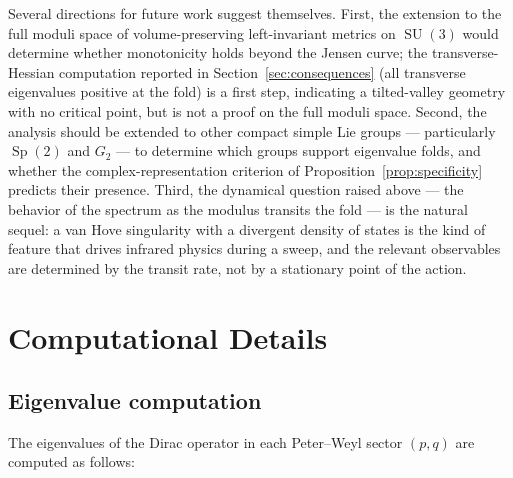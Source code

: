 \documentclass[12pt]{article}
\theoremstyle{definition}
\theoremstyle{remark}
\DeclareMathOperator{\SU}{SU}
\DeclareMathOperator{\Sp}{Sp}
\begin{document}
Several directions for future work suggest themselves.  First, the
extension to the full moduli space of volume-preserving left-invariant
metrics on $\SU(3)$ would determine whether monotonicity holds beyond
the Jensen curve; the transverse-Hessian computation reported in
Section~\ref{sec:consequences} (all transverse eigenvalues positive at
the fold) is a first step, indicating a tilted-valley geometry with no
critical point, but is not a proof on the full moduli space.  Second,
the analysis should be extended to other compact simple Lie groups ---
particularly $\Sp(2)$ and $G_2$ --- to determine which groups support
eigenvalue folds, and whether the complex-representation criterion of
Proposition~\ref{prop:specificity} predicts their presence.  Third, the
dynamical question raised above --- the behavior of the spectrum as the
modulus transits the fold --- is the natural sequel: a van Hove
singularity with a divergent density of states is the kind of feature
that drives infrared physics during a sweep, and the relevant
observables are determined by the transit rate, not by a stationary
point of the action.


\appendix
\section{Computational Details}\label{app:computational}

\subsection{Eigenvalue computation}

The eigenvalues of the Dirac operator in each Peter--Weyl sector
$(p,q)$ are computed as follows:
\end{document}
